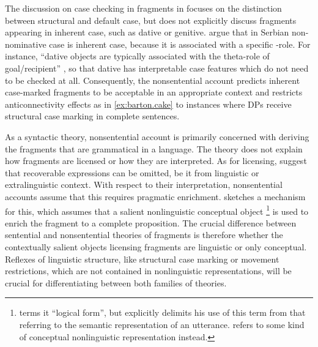 The discussion on case checking in fragments in \citet{barton.progovac2005} focuses on the distinction between structural and default case, but does not explicitly discuss fragments appearing in inherent case, such as dative or genitive. \citet[338-341]{progovac.etal2006} argue that in Serbian non-nominative case is inherent case, because it is associated with a specific \texttheta-role. For instance, ``dative objects are typically associated with the theta-role of goal/recipient'' \citep[339]{progovac.etal2006}, so that dative has interpretable case features which do not need to be checked at all. Consequently, the nonsentential account predicts inherent case-marked fragments to be acceptable in an appropriate context and restricts anticonnectivity effects as in \ref{ex:barton.cake} to instances where DPs receive structural case marking in complete sentences.

As a syntactic theory,  nonsentential account is primarily concerned with deriving the fragments that are grammatical in a language. The theory does not explain how fragments are licensed or how they are interpreted. As for licensing, \citet[89]{barton.progovac2005} suggest that recoverable expressions can be omitted, be it from linguistic or extralinguistic context. With respect to their interpretation, nonsentential accounts assume that this requires pragmatic enrichment. \citet{stainton2006} sketches a mechanism for this, which assumes that a salient nonlinguistic conceptual object%
%
\footnote{\citet[186-189]{stainton2006} terms it ``logical form'', but explicitly delimits his use of this term from that referring to the semantic representation of an utterance. \citeauthor{stainton2006} refers to some kind of conceptual nonlinguistic representation instead.}\afterfn%
%
is used to enrich the fragment to a complete proposition. The crucial difference between sentential and nonsentential theories of fragments is therefore whether the contextually salient objects licensing fragments are linguistic or only conceptual. Reflexes of linguistic structure, like structural case marking or movement restrictions, which are not contained in nonlinguistic representations, will be crucial for differentiating between both families of theories.

